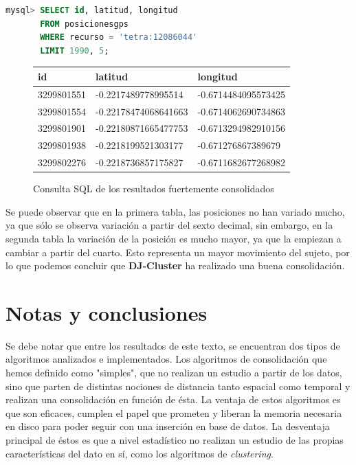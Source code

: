 \documentclass[a4paper, 12pt]{article}
\begin{document}
\begin{lstlisting}[language=sql, columns=fullflexible, basicstyle=\small, frame=tbrl, showstringspaces=false]
mysql> SELECT id, latitud, longitud 
	   FROM posicionesgps 
	   WHERE recurso = 'tetra:12086044' 
	   LIMIT 1990, 5;
\end{lstlisting}

\begin{figure}[H]
	\begin{tabular}{| l | l | l |}
	\hline
	\rowcolor{LightCyan}
	\hline
  		id & latitud & longitud \\
	\hline
	3299801551 & -0.2217489778995514 & -0.6714484095573425 \\
	3299801554 & -0.22178474068641663 & -0.6714062690734863 \\
	3299801901 & -0.22180871665477753 & -0.6713294982910156 \\
	3299801938 & -0.2218199521303177 & -0.671276867389679 \\
	3299802276 & -0.2218736857175827 & -0.6711682677268982 \\
	\hline
	\end{tabular}
	\caption{Consulta SQL de los resultados fuertemente consolidados}
\end{figure}

Se puede observar que en la primera tabla, las posiciones no han variado mucho, ya que s\'olo se observa variaci\'on a partir del sexto decimal, sin embargo, en la segunda tabla la variaci\'on de la posici\'on es mucho mayor, ya que la empiezan a cambiar a partir del cuarto. Esto representa un mayor movimiento del sujeto, por lo que podemos concluir que \textbf{DJ-Cluster} ha realizado una buena consolidaci\'on.


\pagebreak
\section{Notas y conclusiones}

Se debe notar que entre los resultados de este texto, se encuentran dos tipos de algoritmos analizados e implementados. Los algoritmos de consolidaci\'on que hemos definido como "simples", que no realizan un estudio a partir de los datos, sino que parten de distintas nociones de distancia tanto espacial como temporal y realizan una consolidaci\'on en funci\'on de \'esta. La ventaja de estos algoritmos es que son eficaces, cumplen el papel que prometen y liberan la memoria necesaria en disco para poder seguir con una inserci\'on en base de datos. La desventaja principal de \'estos es que a nivel estad\'istico no realizan un estudio de las propias caracter\'isticas del dato en s\'i, como los algoritmos de \textit{clustering}.\\
\end{document}
